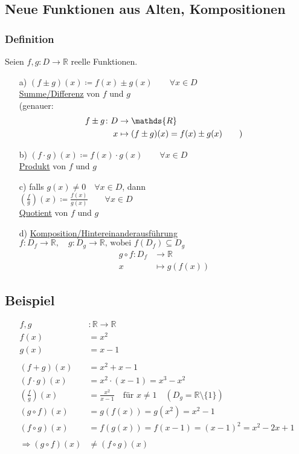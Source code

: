 \documentclass[12pt, titlepage]{article}
\newcommand{\R}{\mathds{R}}
\renewcommand{\*}{\cdot}
\begin{document}
	\subsection{Neue Funktionen aus Alten, Kompositionen}
	\subsubsection*{Definition}
	Seien $f,g\colon D\rightarrow \R$ reelle Funktionen.
	\begin{itemize}
		\item[a)] $(f\pm g)(x)\coloneqq f(x)\pm g(x)\qquad \forall x\in D$\\
				  \underline{Summe/Differenz} von $f$ und $g$\\
				  (genauer:\vspace{-0.5cm} \begin{align*}
				  	f\pm g\colon D&\rightarrow \R\\
				  	x&\mapsto (f\pm g)(x)=f(x)\pm g(x) \textrm{\qquad )}\end{align*}
		\item[b)] $(f\* g)(x)\coloneqq f(x)\* g(x)\qquad \forall x\in D$\\
		\underline{Produkt} von $f$ und $g$
		\item[c)] falls $g(x)\neq 0\quad \forall x\in D$, dann\\
		$(\frac{f}{g})(x)\coloneqq\frac{f(x)}{g(x)}\qquad \forall x\in D$\\
		\underline{Quotient} von $f$ und $g$
		\item[d)] \underline{Komposition/Hintereinanderausführung}\\
		$f\colon D_f\rightarrow \R,\quad g\colon D_g\rightarrow\R\textrm{, wobei } f(D_f)\subseteq D_g$\\
		\vspace{-0.5cm}\begin{align*}
			g\circ f\colon D_f&\rightarrow\R\\
			x&\mapsto g(f(x))
		\end{align*}
	\end{itemize}
	\subsection{Beispiel}
	\begin{align*}
		f,g&\colon \R\rightarrow\R\\
		f(x)&=x^2\\
		g(x)&=x-1\\
		\\
		(f+g)(x)&=x^2+x-1\\
		(f\* g)(x)&=x^2\* (x-1)=x^3-x^2\\
		(\frac{f}{g})(x)&=\frac{x^2}{x-1}\quad\textrm{für }x\neq 1\quad (D_g=\R\setminus \{1\})\\
		(g\circ f)(x)&=g(f(x))=g(x^2)=x^2-1\\
		(f\circ g)(x)&=f(g(x))=f(x-1)=(x-1)^2=x^2-2x+1\\
		\\
		\Rightarrow (g\circ f)(x)&\neq (f\circ g)(x)
	\end{align*}
\end{document}
